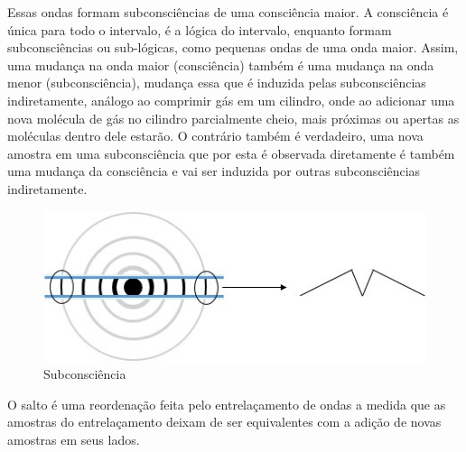 Essas ondas formam subconsciências de uma consciência maior. A consciência é única para todo o intervalo, é a lógica do intervalo, enquanto formam subconsciências ou sub-lógicas, como pequenas ondas de uma onda maior. Assim, uma mudança na onda maior (consciência) também é uma mudança na onda menor (subconsciência), mudança essa que é induzida pelas subconsciências indiretamente, análogo ao comprimir gás em um cilindro, onde ao adicionar uma nova molécula de gás no cilindro parcialmente cheio, mais próximas ou apertas as moléculas dentro dele estarão. O contrário também é verdadeiro, uma nova amostra em uma subconsciência que por esta é observada diretamente é também uma mudança da consciência e vai ser induzida por outras subconsciências indiretamente.
	\begin{figure}[H]
	\caption{Subconsciência}
	\label{fig:consciousness_subconscious}
	\centering
	\includegraphics[scale=1]{sections/images/consciousness_subconscious.jpg}
	\end{figure}

O salto é uma reordenação feita pelo entrelaçamento de ondas a medida que as amostras do entrelaçamento deixam de ser equivalentes com a adição de novas amostras em seus lados.


